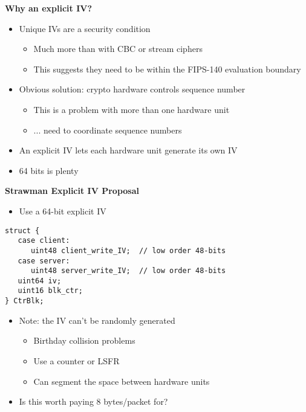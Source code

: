 \documentclass[fancybox]{seminar}
\newcommand{\heading}[1]{%
  \begin{center}
    \large\bf
    #1
  \end{center}
  \vspace{.4 in}}
\begin{document}
\begin{slide}
\heading{Why an explicit IV?}

\begin{itemize}
\item Unique IVs are a security condition
\begin{itemize}
\item Much more than with CBC or stream ciphers
\item This suggests they need to be within the FIPS-140 evaluation boundary
\end{itemize}
\item Obvious solution: crypto hardware controls sequence number
\begin{itemize}
\item This is a problem with more than one hardware unit
\item ... need to coordinate sequence numbers
\end{itemize}
\item An explicit IV lets each hardware unit generate its own IV
\item 64 bits is plenty
\end{itemize}
\end{slide}

\begin{slide}
\heading{Strawman Explicit IV Proposal}

\vspace{-.35 in}
\begin{itemize}
\item Use a 64-bit explicit IV
\end{itemize}

{\small
\begin{verbatim}
struct {
   case client:
      uint48 client_write_IV;  // low order 48-bits
   case server:
      uint48 server_write_IV;  // low order 48-bits
   uint64 iv;
   uint16 blk_ctr;
} CtrBlk;
\end{verbatim}
}


\begin{itemize}
\item Note: the IV can't be randomly generated
\begin{itemize}
\item Birthday collision problems
\item Use a counter or LSFR
\item Can segment the space between hardware units
\end{itemize}
\item Is this worth paying 8 bytes/packet for?
\end{itemize}
\end{slide}

	
\end{document}
